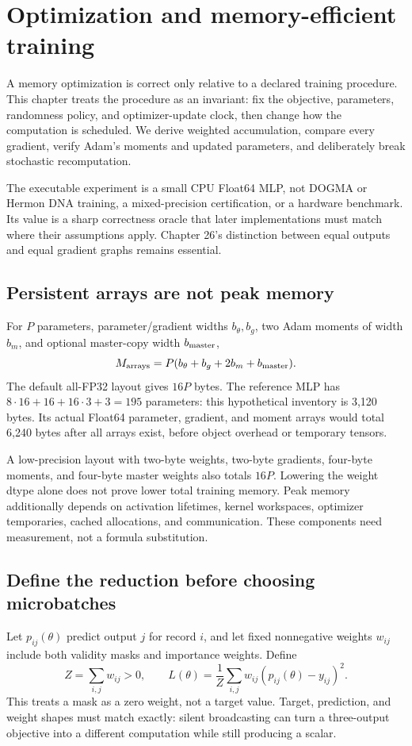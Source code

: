 \chapter{Optimization and memory-efficient training}
A memory optimization is correct only relative to a declared training procedure.
This chapter treats the procedure as an invariant: fix the objective, parameters,
randomness policy, and optimizer-update clock, then change how the computation is
scheduled. We derive weighted accumulation, compare every gradient, verify Adam's
moments and updated parameters, and deliberately break stochastic recomputation.

The executable experiment is a small CPU Float64 MLP, not DOGMA or Hermon DNA
training, a mixed-precision certification, or a hardware benchmark. Its value is a
sharp correctness oracle that later implementations must match where their
assumptions apply. Chapter 26's distinction between equal outputs and equal
gradient graphs remains essential.

\section{Persistent arrays are not peak memory}
For $P$ parameters, parameter/gradient widths $b_\theta,b_g$, two Adam moments of
width $b_m$, and optional master-copy width $b_{\rm master}$,
\[
M_{\rm arrays}=P(b_\theta+b_g+2b_m+b_{\rm master}).
\]
The default all-FP32 layout gives $16P$ bytes. The reference MLP has
$8\cdot16+16+16\cdot3+3=195$ parameters: this hypothetical inventory is 3,120 bytes.
Its actual Float64 parameter, gradient, and moment arrays would total 6,240 bytes
after all arrays exist, before object overhead or temporary tensors.

A low-precision layout with two-byte weights, two-byte gradients, four-byte
moments, and four-byte master weights also totals $16P$. Lowering the weight dtype
alone does not prove lower total training memory. Peak memory additionally depends
on activation lifetimes, kernel workspaces, optimizer temporaries, cached allocations,
and communication. These components need measurement, not a formula substitution.

\section{Define the reduction before choosing microbatches}
Let $p_{ij}(\theta)$ predict output $j$ for record $i$, and let fixed
nonnegative weights $w_{ij}$ include both validity masks and importance weights.
Define
\[
Z=\sum_{i,j}w_{ij}>0,\qquad
L(\theta)=\frac1Z\sum_{i,j}w_{ij}(p_{ij}(\theta)-y_{ij})^2.
\]
This  treats a mask as a zero weight, not a target value. Target, prediction, and weight shapes
must match exactly: silent broadcasting can turn a three-output objective into a
different computation while still producing a scalar.

